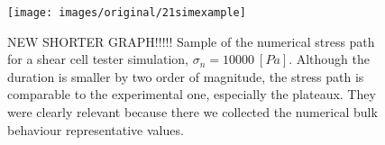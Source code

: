 \begin{figure}[!htb] 
\centering 
\texttt{[image: images/original/21simexample]} 
\caption[Numerical stress path]{NEW SHORTER GRAPH!!!!! Sample of the numerical
stress path for a shear cell tester simulation, $\sigma_n = 10000 ~[Pa]$.
Although the duration is smaller by two order of magnitude, the stress path is comparable to the experimental one, especially the plateaux.
They were clearly relevant because there we collected the numerical bulk
behaviour representative values.}
\label{fig:21simexample} 
\end{figure}


